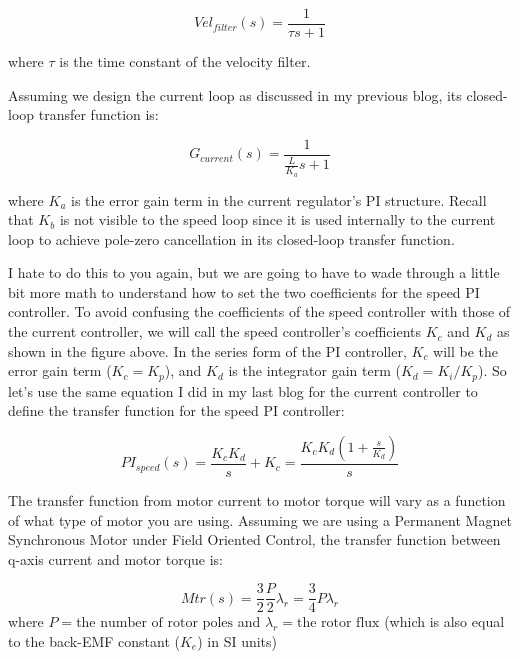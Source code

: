 \begin{equation}\label{eq:3_1}
    Vel_{filter}(s) = \frac{1}{\tau s+1}
\end{equation}

where $\tau$ is the time constant of the velocity filter.

Assuming we design the current loop as discussed in my previous blog, its closed-loop transfer function is:

\begin{equation}\label{eq:3_2}
    G_{current}(s) = \frac{1}{\frac{L}{K_a}s+1}
\end{equation}

where $K_a$ is the error gain term in the current regulator’s PI structure.  Recall that $K_b$ is not visible to the speed loop since it is used internally to the current loop to achieve pole-zero cancellation in its closed-loop transfer function.

I hate to do this to you again, but we are going to have to wade through a little bit more math to understand how to set the two coefficients for the speed PI controller.  To avoid confusing the coefficients of the speed controller with those of the current controller, we will call the speed controller’s coefficients $K_c$ and $K_d$ as shown in the figure above.  In the series form of the PI controller, $K_c$ will be the error gain term ($K_c = K_p$), and $K_d$ is the integrator gain term ($K_d = K_i/K_p$).  So let’s use the same equation I did in my last blog for the current controller to define the transfer function for the speed PI controller:

\begin{equation}\label{eq:3_3}
    PI_{speed}(s) = \frac{K_cK_d}{s}+K_c = \frac{K_cK_d\left(1+\frac{s}{K_d}\right)}{s}
\end{equation}

The transfer function from motor current to motor torque will vary as a function of what type of motor you are using.  Assuming we are using a Permanent Magnet Synchronous Motor under Field Oriented Control, the transfer function between q-axis current and motor torque is:

\begin{equation}\label{eq:3_4}
    Mtr(s) = \frac{3}{2}\frac{P}{2}\lambda_r = \frac{3}{4}P \lambda _r
\end{equation}
where $P = \text{the number of rotor poles}$ and $\lambda_r = \text{the rotor flux}$ (which is also equal to the back-EMF constant ($K_e$) in SI units)
\\

